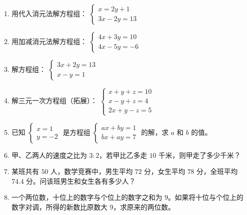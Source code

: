 \documentclass[12pt, a4paper]{ctexart}
\begin{document}
\begin{enumerate}[label=\textbf{\arabic*.}, leftmargin=2em]
  \item 用代入消元法解方程组：
  $\begin{cases} x = 2y + 1 \\ 3x - 2y = 13 \end{cases}$

  \item 用加减消元法解方程组：
  $\begin{cases} 4x + 3y = 10 \\ 4x - 5y = -6 \end{cases}$

  \item 解方程组：
  $\begin{cases} 3x + 2y = 13 \\ x - y = 1 \end{cases}$

  \item 解三元一次方程组（拓展）：
  $\begin{cases} x + y + z = 10 \\ x - y + z = 4 \\ 2x + y - z = 5 \end{cases}$

  \item 已知 $\begin{cases} x = 1 \\ y = -2 \end{cases}$ 是方程组 $\begin{cases} ax + by = 1 \\ bx + ay = 7 \end{cases}$ 的解，求 $a$ 和 $b$ 的值。

  \item 甲、乙两人的速度之比为 $3:2$，若甲比乙多走 $10$ 千米，则甲走了多少千米？

  \item 某班共有 $50$ 人，数学竞赛中，男生平均 $72$ 分，女生平均 $78$ 分，全班平均 $74.4$ 分。问该班男生和女生各有多少人？

  \item 一个两位数，十位上的数字与个位上的数字之和为 $9$。如果将十位与个位上的数字对调，所得的新数比原数大 $9$，求原来的两位数。
\end{enumerate}

\bigskip
\end{document}
